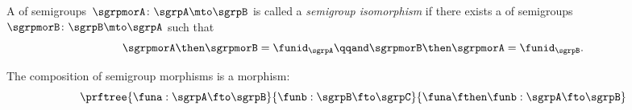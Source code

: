 \begin{ctdefinition}
  \label{def:semigroup-iso}
  A \whomo of semigroups~$\sgrpmorA\colon \sgrpA \mto \sgrpB$ is called a \emph{semigroup isomorphism} if there exists a \whomo of semigroups~$\sgrpmorB\colon \sgrpB \mto \sgrpA$ such that
  \begin{equation}
    \label{eq:sgrp-iso-cond}
    \sgrpmorA \then \sgrpmorB = \funid_\sgrpA  \qqand \sgrpmorB \then \sgrpmorA = \funid_\sgrpB.
  \end{equation}
\end{ctdefinition}

\begin{lemma}
  \label{lem:semigroup-morphisms-compose}
  The composition of semigroup morphisms is a morphism:
  \begin{equation}
    \label{eq:sgrp-mor-compo}
    \prftree{\funa  : \sgrpA \fto \sgrpB}{\funb : \sgrpB \fto \sgrpC}{
      \funa \fthen \funb  : \sgrpA \fto \sgrpB}
  \end{equation}
\end{lemma}

